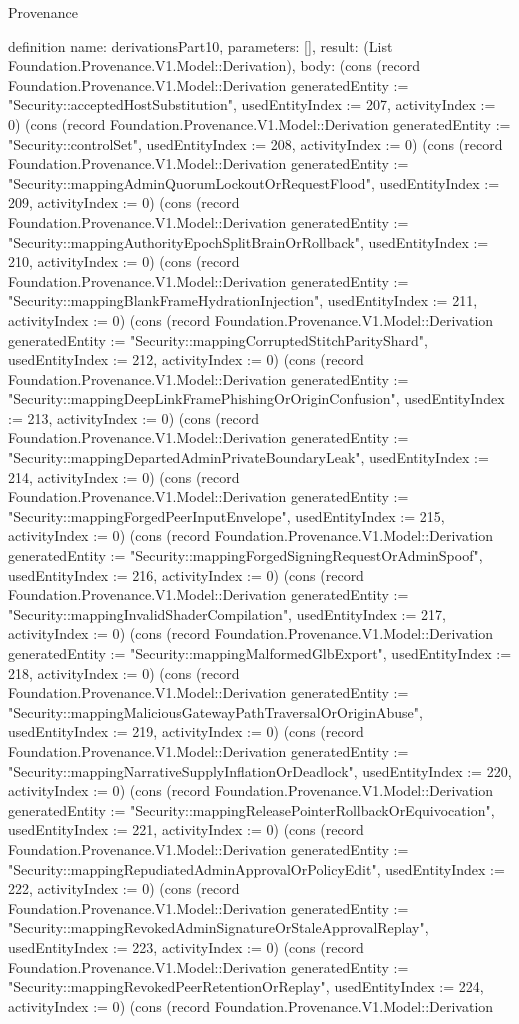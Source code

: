 \begin{lexlean}{Provenance}
\begin{semanticmodule}
definition{
  name: derivationsPart10,
  parameters: [],
  result: (List Foundation.Provenance.V1.Model::Derivation),
  body: (cons (record Foundation.Provenance.V1.Model::Derivation {generatedEntity := "Security::acceptedHostSubstitution", usedEntityIndex := 207, activityIndex := 0}) (cons (record Foundation.Provenance.V1.Model::Derivation {generatedEntity := "Security::controlSet", usedEntityIndex := 208, activityIndex := 0}) (cons (record Foundation.Provenance.V1.Model::Derivation {generatedEntity := "Security::mappingAdminQuorumLockoutOrRequestFlood", usedEntityIndex := 209, activityIndex := 0}) (cons (record Foundation.Provenance.V1.Model::Derivation {generatedEntity := "Security::mappingAuthorityEpochSplitBrainOrRollback", usedEntityIndex := 210, activityIndex := 0}) (cons (record Foundation.Provenance.V1.Model::Derivation {generatedEntity := "Security::mappingBlankFrameHydrationInjection", usedEntityIndex := 211, activityIndex := 0}) (cons (record Foundation.Provenance.V1.Model::Derivation {generatedEntity := "Security::mappingCorruptedStitchParityShard", usedEntityIndex := 212, activityIndex := 0}) (cons (record Foundation.Provenance.V1.Model::Derivation {generatedEntity := "Security::mappingDeepLinkFramePhishingOrOriginConfusion", usedEntityIndex := 213, activityIndex := 0}) (cons (record Foundation.Provenance.V1.Model::Derivation {generatedEntity := "Security::mappingDepartedAdminPrivateBoundaryLeak", usedEntityIndex := 214, activityIndex := 0}) (cons (record Foundation.Provenance.V1.Model::Derivation {generatedEntity := "Security::mappingForgedPeerInputEnvelope", usedEntityIndex := 215, activityIndex := 0}) (cons (record Foundation.Provenance.V1.Model::Derivation {generatedEntity := "Security::mappingForgedSigningRequestOrAdminSpoof", usedEntityIndex := 216, activityIndex := 0}) (cons (record Foundation.Provenance.V1.Model::Derivation {generatedEntity := "Security::mappingInvalidShaderCompilation", usedEntityIndex := 217, activityIndex := 0}) (cons (record Foundation.Provenance.V1.Model::Derivation {generatedEntity := "Security::mappingMalformedGlbExport", usedEntityIndex := 218, activityIndex := 0}) (cons (record Foundation.Provenance.V1.Model::Derivation {generatedEntity := "Security::mappingMaliciousGatewayPathTraversalOrOriginAbuse", usedEntityIndex := 219, activityIndex := 0}) (cons (record Foundation.Provenance.V1.Model::Derivation {generatedEntity := "Security::mappingNarrativeSupplyInflationOrDeadlock", usedEntityIndex := 220, activityIndex := 0}) (cons (record Foundation.Provenance.V1.Model::Derivation {generatedEntity := "Security::mappingReleasePointerRollbackOrEquivocation", usedEntityIndex := 221, activityIndex := 0}) (cons (record Foundation.Provenance.V1.Model::Derivation {generatedEntity := "Security::mappingRepudiatedAdminApprovalOrPolicyEdit", usedEntityIndex := 222, activityIndex := 0}) (cons (record Foundation.Provenance.V1.Model::Derivation {generatedEntity := "Security::mappingRevokedAdminSignatureOrStaleApprovalReplay", usedEntityIndex := 223, activityIndex := 0}) (cons (record Foundation.Provenance.V1.Model::Derivation {generatedEntity := "Security::mappingRevokedPeerRetentionOrReplay", usedEntityIndex := 224, activityIndex := 0}) (cons (record Foundation.Provenance.V1.Model::Derivation }
\end{semanticmodule}
\end{lexlean}

